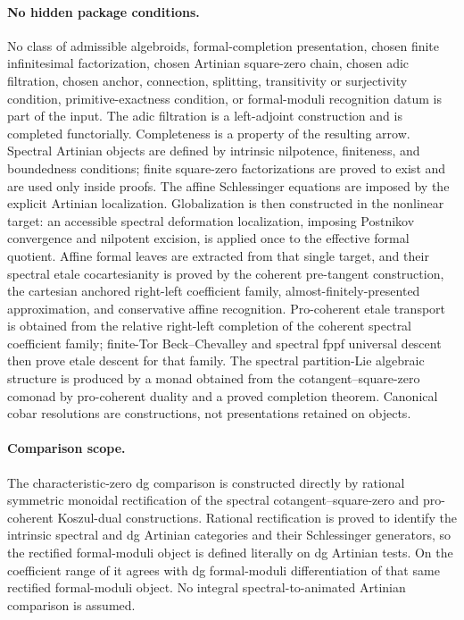 \paragraph{No hidden package conditions.}
No class of admissible algebroids, formal-completion presentation, chosen
finite infinitesimal factorization, chosen Artinian square-zero chain, chosen
adic filtration, chosen anchor, connection, splitting, transitivity or
surjectivity condition, primitive-exactness condition, or formal-moduli
recognition datum is part of the input.  The adic filtration is a left-adjoint
construction and is completed functorially.  Completeness is a property of
the resulting arrow.  Spectral Artinian objects are defined by intrinsic
nilpotence, finiteness, and boundedness conditions; finite square-zero
factorizations are proved to exist and are used only inside proofs.  The
affine Schlessinger equations are imposed by the explicit Artinian
localization.  Globalization is then constructed in the nonlinear target:
an accessible spectral deformation localization, imposing Postnikov
convergence and nilpotent excision, is applied once to the effective formal
quotient.  Affine formal leaves are extracted from that single target, and
their spectral etale cocartesianity is proved by the coherent pre-tangent
construction, the cartesian anchored right-left coefficient family,
almost-finitely-presented approximation, and conservative affine recognition.  Pro-coherent etale transport is
obtained from the relative right-left completion of the coherent spectral
coefficient family; finite-Tor Beck--Chevalley and spectral fppf universal
descent then prove etale descent for that family.  The spectral partition-Lie
algebraic structure
is produced by a monad obtained from the cotangent--square-zero comonad by
pro-coherent duality and a proved completion theorem.  Canonical cobar
resolutions are constructions, not presentations retained on objects.

\paragraph{Comparison scope.}
The characteristic-zero dg comparison is constructed directly by rational
symmetric monoidal rectification of the spectral cotangent--square-zero and
pro-coherent Koszul-dual constructions.  Rational rectification is proved to
identify the intrinsic spectral and dg Artinian categories and their
Schlessinger generators, so the rectified formal-moduli object is defined
literally on dg Artinian tests.  On the coefficient range of
\cite{Nuiten2019} it agrees with dg formal-moduli differentiation of that same
rectified formal-moduli object.  No integral spectral-to-animated Artinian
comparison is assumed.

